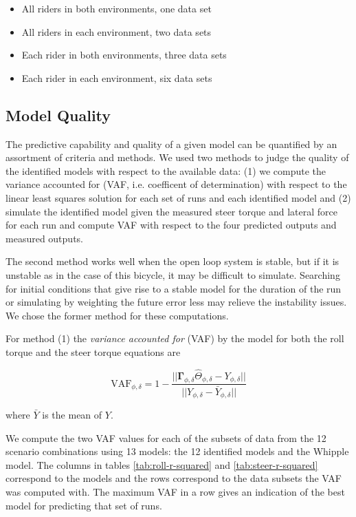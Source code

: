 \documentclass[a4paper]{article}
\begin{document}
\begin{itemize}
  \item
    All riders in both environments, one data set
  \item
    All riders in each environment, two data sets
  \item
    Each rider in both environments, three data sets
  \item
    Each rider in each environment, six data sets
\end{itemize}

\subsection{Model Quality}

The predictive capability and quality of a given model can be quantified by an
assortment of criteria and methods. We used two methods to judge the quality
of the identified models with respect to the available data: (1) we compute the
variance accounted for (VAF, i.e. coefficent of determination) with respect to
the linear least squares solution for each set of runs and each identified model
and (2) simulate the identified model given the measured steer torque and
lateral force for each run and compute VAF with respect to the four predicted
outputs and measured outputs.

The second method works well when the open loop system is stable, but if it is
unstable as in the case of this bicycle, it may be difficult to simulate.
Searching for initial conditions that give rise to a stable model for the
duration of the run or simulating by weighting the future error less may
relieve the instability issues. We chose the former method for these
computations.

For method (1) the \emph{variance accounted for} (VAF) by the model for both
the roll torque and the steer torque equations are

\begin{equation}
  \label{eq:vaf}
  \textrm{VAF}_{\phi,\delta} = 1 - \frac{\vert \vert
    \mathbf{\Gamma}_{\phi,\delta}\hat{\Theta}_{\phi,\delta} - Y_{\phi,\delta} \vert \vert}
                            {\vert \vert Y_{\phi,\delta} - \bar{Y}_{\phi,\delta} \vert \vert}
\end{equation}

where $\bar{Y}$ is the mean of $Y$.

We compute the two VAF values for each of the subsets of data from the 12
scenario combinations using 13 models: the 12 identified models and the Whipple
model. The columns in tables \ref{tab:roll-r-squared} and
\ref{tab:steer-r-squared} correspond to the models and the rows correspond to
the data subsets the VAF was computed with. The maximum VAF in a row gives an
indication of the best model for predicting that set of runs.
\end{document}
